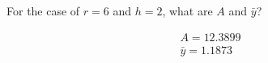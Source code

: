 For the case of $r=6$ and $h = 2$, what are $A$ and $\bar{y}$?

\begin{solution}
    \begin{align*}
        A = 12.3899 \\
        \bar{y} = 1.1873
    \end{align*}
\end{solution}